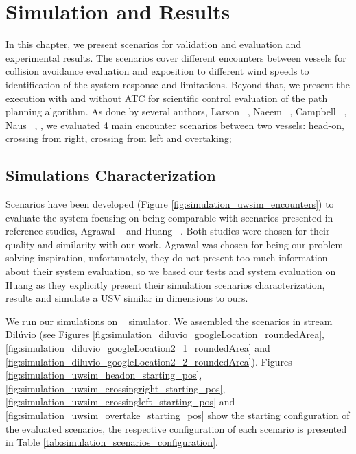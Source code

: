 \chapter{Simulation and Results}
\label{chap:5_Simulation_And_Results}
    
        In this chapter, we present scenarios for validation and evaluation and experimental results. The scenarios cover different encounters between vessels for collision avoidance evaluation and exposition to different wind speeds to identification of the system response and limitations. Beyond that, we present the execution with and without \ac{ATC} for scientific control evaluation of the path planning algorithm. As done by several authors, \eg{} Larson \etal{} ~\cite{Larson2006Autonomous}, Naeem \etal{} ~\cite{Naeem2012COLREGS}, Campbell \etal{} ~\cite{Campbell2013Automatic}, Naus ~\cite{Naus2013Idea}, \etc{}, we evaluated 4 main encounter scenarios between two vessels: head-on, crossing from right, crossing from left and overtaking;

    \section{Simulations Characterization}
    
    Scenarios have been developed (Figure \ref{fig:simulation_uwsim_encounters}) to evaluate the system focusing on being comparable with scenarios presented in reference studies, \ie{} Agrawal \etal{} ~\cite{Agrawal2015COLREGS} and Huang \etal{} ~\cite{Huang2019Generalized}. Both studies were chosen for their quality and similarity with our work. Agrawal \etal{} was chosen for being our problem-solving inspiration, unfortunately, they do not present too much information about their system evaluation, so we based our tests and system evaluation on Huang \etal{} as they explicitly present their simulation scenarios characterization, results and simulate a \ac{USV} similar in dimensions to ours.
    
    We run our simulations on \usvsim ~\cite{Paravisi2018Toward} simulator. We assembled the scenarios in stream Dilúvio (see Figures \ref{fig:simulation_diluvio_googleLocation_roundedArea}, \ref{fig:simulation_diluvio_googleLocation2_1_roundedArea} and \ref{fig:simulation_diluvio_googleLocation2_2_roundedArea}). Figures \ref{fig:simulation_uwsim_headon_starting_pos}, \ref{fig:simulation_uwsim_crossingright_starting_pos}, \ref{fig:simulation_uwsim_crossingleft_starting_pos} and \ref{fig:simulation_uwsim_overtake_starting_pos} show the starting configuration of the evaluated scenarios, the respective configuration of each scenario is presented in Table \ref{tab:simulation_scenarios_configuration}.
    
